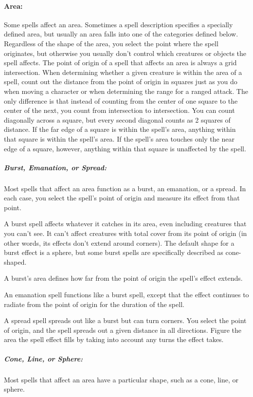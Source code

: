 \paragraph{Area:} Some spells affect an area. Sometimes a spell description specifies a specially defined area, but usually an area falls into one of the categories defined below.
Regardless of the shape of the area, you select the point where the spell originates, but otherwise you usually don't control which creatures or objects the spell affects. 
The point of origin of a spell that affects an area is always a grid intersection. 
When determining whether a given creature is within the area of a spell, count out the distance from the point of origin in squares just as you do when moving a character or when determining the range for a ranged attack. 
The only difference is that instead of counting from the center of one square to the center of the next, you count from intersection to intersection.
You can count diagonally across a square, but every second diagonal counts as 2 squares of distance. 
If the far edge of a square is within the spell's area, anything within that square is within the spell's area. 
If the spell's area touches only the near edge of a square, however, anything within that square is unaffected by the spell.

\subparagraph{Burst, Emanation, or Spread:} Most spells that affect an area function as a burst, an emanation, or a spread. 
In each case, you select the spell's point of origin and measure its effect from that point. 

A burst spell affects whatever it catches in its area, even including creatures that you can't see. 
It can't affect creatures with total cover from its point of origin (in other words, its effects don't extend around corners). 
The default shape for a burst effect is a sphere, but some burst spells are specifically described as cone-shaped.

A burst's area defines how far from the point of origin the spell's effect extends.

An emanation spell functions like a burst spell, except that the effect continues to radiate from the point of origin for the duration of the spell.

A spread spell spreads out like a burst but can turn corners. You select the point of origin, and the spell spreads out a given distance in all directions. 
Figure the area the spell effect fills by taking into account any turns the effect takes.

\subparagraph{Cone, Line, or Sphere:} Most spells that affect an area have a particular shape, such as a cone, line, or sphere. 

